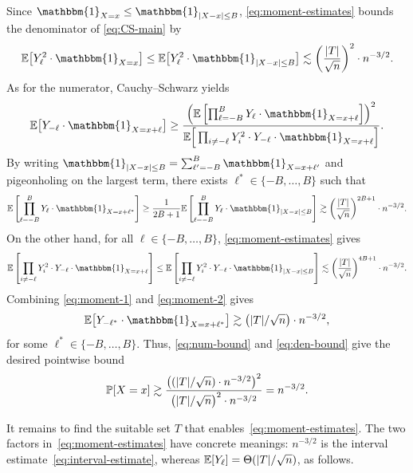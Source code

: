 Since $\mathbbm{1}_{X = x} \leq \mathbbm{1}_{|X - x| \leq B}$, \eqref{eq:moment-estimates} bounds the denominator of \eqref{eq:CS-main} by
\begin{equation}
  \label{eq:den-bound}
  \E\bigl[Y_\ell^2 \cdot \mathbbm{1}_{X = x}\bigr] \leq \E\bigl[Y_\ell^2 \cdot \mathbbm{1}_{|X - x| \leq B}\bigr] \lesssim \left(\frac{|T|}{\sqrt n}\right)^2 \cdot n^{-3/2}.
\end{equation}
As for the numerator, Cauchy--Schwarz yields
\[
  \E\bigl[Y_{-\ell} \cdot \mathbbm{1}_{X = x + \ell}\bigr] \geq \frac{\left(\E\left[\prod_{\ell=-B}^B Y_\ell \cdot \mathbbm{1}_{X = x + \ell}\right]\right)^2}{\E\Big[\prod_{i\ne -\ell}Y_i^{2}\cdot Y_{-\ell} \cdot \mathbbm{1}_{X = x + \ell}\Big]}.
\]
By writing $\mathbbm{1}_{|X - x| \leq B} = \sum_{\ell' = -B}^{B} \mathbbm{1}_{X = x + \ell'}$ and pigeonholing on the largest term, there exists $\ell^* \in \{-B, \ldots, B\}$ such that
\begin{equation}
  \label{eq:moment-1}
  \E\left[\prod_{\ell=-B}^B Y_\ell \cdot \mathbbm{1}_{X = x + \ell^*}\right] \geq \frac{1}{2B+1}\E\left[\prod_{\ell=-B}^B Y_\ell \cdot \mathbbm{1}_{|X - x| \leq B}\right] \gtrsim \left(\frac{|T|}{\sqrt n}\right)^{2B + 1} \cdot n^{-3/2}.
\end{equation}
On the other hand, for all $\ell \in \{-B, \ldots, B\}$, \eqref{eq:moment-estimates} gives
\begin{equation}
  \label{eq:moment-2}
  \E\left[\prod_{i\neq -\ell}Y_i^{2}\cdot Y_{-\ell} \cdot \mathbbm{1}_{X = x + \ell}\right] \leq \E\left[\prod_{i\neq -\ell}Y_i^{2}\cdot Y_{-\ell} \cdot \mathbbm{1}_{|X - x| \leq B}\right] \lesssim \left(\frac{|T|}{\sqrt n}\right)^{4B + 1} \cdot n^{-3/2}.
\end{equation}
Combining \eqref{eq:moment-1} and \eqref{eq:moment-2} gives
\begin{equation}
  \label{eq:num-bound}
  \E\bigl[Y_{-\ell^*} \cdot \mathbbm{1}_{X = x + \ell^*}\bigr] \gtrsim \bigl(|T| / \sqrt{n}\bigr) \cdot n^{-3/2},
\end{equation}
for some $\ell^* \in \{-B, \ldots, B\}$. Thus, \eqref{eq:num-bound} and \eqref{eq:den-bound} give the desired pointwise bound
\[
  \mathbb{P}[X = x] \gtrsim \frac{\bigl((|T| / \sqrt{n}) \cdot n^{-3/2}\bigr)^2}{\bigl(|T| / \sqrt{n}\bigr)^{2} \cdot n^{-3/2}} = n^{-3/2}.
\]

It remains to find the suitable set $T$ that enables~\eqref{eq:moment-estimates}. The two factors in~\eqref{eq:moment-estimates} have concrete meanings: $n^{-3/2}$ is the interval estimate~\eqref{eq:interval-estimate}, whereas $\mathbb{E}[Y_\ell] = \Theta(|T|/\sqrt n)$, as follows.

